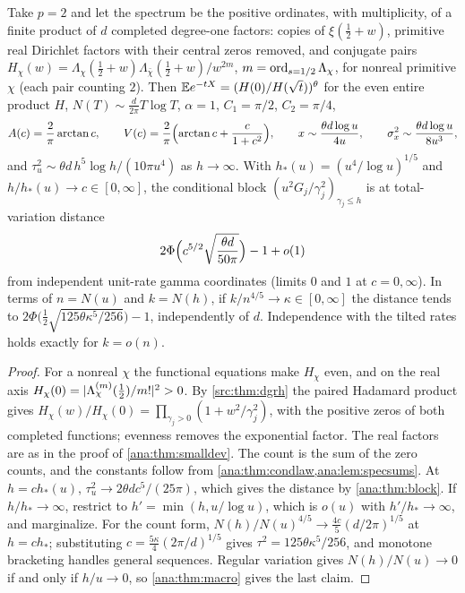 \begin{corollary}\label{ana:cor:fourfifths}
Take $p=2$ and let the spectrum be the positive ordinates, with multiplicity, of a finite product of
$d$ completed degree-one factors: copies of $\xi(\frac12+w)$, primitive real Dirichlet factors with
their central zeros removed, and conjugate pairs
$H_\chi(w)=\Lambda_\chi(\frac12+w)\Lambda_{\bar\chi}(\frac12+w)/w^{2m}$, $m=\operatorname{ord}_{s=1/2}\Lambda_\chi$,
for nonreal primitive $\chi$ (each pair counting $2$). Then $\mathbb{E} e^{-tX}=(H(0)/H(\sqrt t))^\theta$
for the even entire product $H$, $N(T)\sim\frac d{2\pi}T\log T$, $\alpha=1$, $C_1=\pi/2$, $C_2=\pi/4$,
\[
 A(c)=\frac2\pi\arctan c,\qquad V(c)=\frac2\pi\Bigl(\arctan c+\frac c{1+c^2}\Bigr),\qquad
 x\sim\frac{\theta d\log u}{4u},\qquad\sigma_x^2\sim\frac{\theta d\log u}{8u^3},
\]
and $\tau_u^2\sim\theta d\,h^5\log h/(10\pi u^4)$ as $h\to\infty$. With $h_*(u)=(u^4/\log u)^{1/5}$ and
$h/h_*(u)\to c\in[0,\infty]$, the conditional block $(u^2G_j/\gamma_j^2)_{\gamma_j\le h}$ is at
total-variation distance
\[
 2\Phi\Bigl(c^{5/2}\sqrt{\frac{\theta d}{50\pi}}\Bigr)-1+o(1)
\]
from independent unit-rate gamma coordinates (limits $0$ and $1$ at $c=0,\infty$). In terms of
$n=N(u)$ and $k=N(h)$, if $k/n^{4/5}\to\kappa\in[0,\infty]$ the distance tends to
$2\Phi\bigl(\frac12\sqrt{125\theta\kappa^5/256}\bigr)-1$, independently of $d$. Independence with the
tilted rates holds exactly for $k=o(n)$.
\end{corollary}

\begin{proof}
For a nonreal $\chi$ the functional equations make $H_\chi$ even, and on the real axis
$H_\chi(0)=\lvert\Lambda_\chi^{(m)}(\frac12)/m!\rvert^2>0$. By \cref{src:thm:dgrh} the paired Hadamard product
gives $H_\chi(w)/H_\chi(0)=\prod_{\gamma_j>0}(1+w^2/\gamma_j^2)$, with the positive zeros of both completed
functions; evenness removes the exponential factor. The real factors are as in the proof of
\cref{ana:thm:smalldev}. The count is the sum of the zero counts, and the constants follow from
\cref{ana:thm:condlaw,ana:lem:specsums}. At $h=ch_*(u)$, $\tau_u^2\to2\theta dc^5/(25\pi)$, which gives
the distance by \cref{ana:thm:block}. If $h/h_*\to\infty$, restrict to $h'=\min(h,u/\log u)$, which is
$o(u)$ with $h'/h_*\to\infty$, and marginalize. For the count form,
$N(h)/N(u)^{4/5}\to\frac{4c}5(d/2\pi)^{1/5}$ at $h=ch_*$; substituting $c=\frac{5\kappa}4(2\pi/d)^{1/5}$
gives $\tau^2=125\theta\kappa^5/256$, and monotone bracketing handles general sequences. Regular
variation gives $N(h)/N(u)\to0$ if and only if $h/u\to0$, so \cref{ana:thm:macro} gives the last
claim.
\end{proof}

